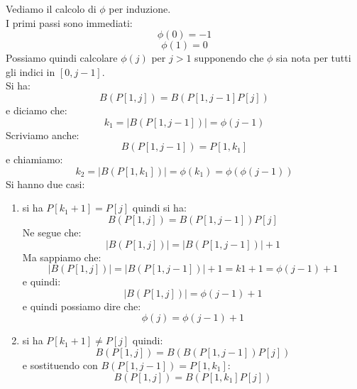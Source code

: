 \begin{definizione}
  Vediamo il calcolo di $\phi$ per induzione.\\
  I primi passi sono immediati:
  \[\phi(0)=-1\]
  \[\phi(1)=0\]
  Possiamo quindi calcolare $\phi(j)$ per $j>1$ supponendo che $\phi$ sia nota
  per tutti gli indici in $[0,j-1]$.\\
  Si ha:
  \[B(P[1,j])=B(P[1, j-1]P[j])\]
  e diciamo che:
  \[k_1=|B(P[1, j-1])|=\phi(j-1)\]
  Scriviamo anche:
  \[B(P[1,j-1]) = P[1,k_1]\]
  e chiamiamo:
  \[k_2=|B(P[1,k_1])|=\phi(k_1)=\phi(\phi(j-1))\]
  Si hanno due casi:
  \begin{enumerate}
    \item si ha $P[k_1+1]=P[j]$ quindi si ha:
    \[B(P[1,j])=B(P[1,j-1])P[j]\]
    Ne segue che:
    \[|B(P[1,j])| = |B(P[1,j-1])| + 1 \]
    Ma sappiamo che:
    \[|B(P[1,j])| = |B(P[1,j-1])| + 1 = k1 + 1 = \phi(j-1) + 1\]
    e quindi:
    \[|B(P[1,j])| = \phi(j-1) + 1\]
    e quindi possiamo dire che:
    \[\phi(j) = \phi(j-1) + 1 \]
    \item si ha $P[k_1+1]\neq P[j]$ quindi:
    \[B(P[1,j]) = B(B(P[1,j-1]) P[j])\]
    e sostituendo con $B(P[1,j-1]) = P[1,k_1]$:
    \[B(P[1,j]) = B(P[1,k_1] P[j])\]
    

\end{enumerate}
\end{definizione}
